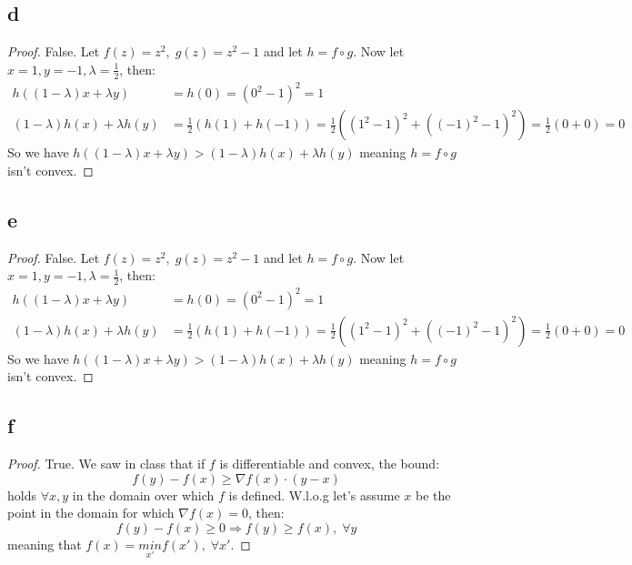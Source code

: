 \subsection*{d}
\begin{proof}    
    False. Let $f(z) = z^2, \; g(z) = z^2-1$ and let $h = f \circ g$. Now let $x=1, y=-1, \lambda=\frac{1}{2}$, then:
    \begin{equation*}
        \begin{split}
            h((1-\lambda)x + \lambda y) &= h(0) = (0^2-1)^2 = 1 \\
            (1-\lambda)h(x) + \lambda h(y) &= \frac{1}{2}(h(1) + h(-1)) = \frac{1}{2}((1^2-1)^2 + ((-1)^2-1)^2) = \frac{1}{2} (0 + 0) = 0
        \end{split}
    \end{equation*}
    So we have $h((1-\lambda)x + \lambda y) > (1-\lambda)h(x) + \lambda h(y)$ meaning $h = f \circ g$ isn't convex.
\end{proof}

\subsection*{e}
\begin{proof}
    False. Let $f(z) = z^2, \; g(z) = z^2-1$ and let $h = f \circ g$. Now let $x=1, y=-1, \lambda=\frac{1}{2}$, then:
    \begin{equation*}
        \begin{split}
            h((1-\lambda)x + \lambda y) &= h(0) = (0^2-1)^2 = 1 \\
            (1-\lambda)h(x) + \lambda h(y) &= \frac{1}{2}(h(1) + h(-1)) = \frac{1}{2}((1^2-1)^2 + ((-1)^2-1)^2) = \frac{1}{2} (0 + 0) = 0
        \end{split}
    \end{equation*}
    So we have $h((1-\lambda)x + \lambda y) > (1-\lambda)h(x) + \lambda h(y)$ meaning $h = f \circ g$ isn't convex.
\end{proof}

\subsection*{f}
\begin{proof}
    True. We saw in class that if $f$ is differentiable and convex, the bound:
    \begin{equation*}
        f(y) - f(x) \geq \nabla f(x) \cdot (y-x)
    \end{equation*}
    holds $\forall x,y$ in the domain over which $f$ is defined. W.l.o.g let's assume $x$ be the point in the domain for which $\nabla f(x) = 0$, then:
    \begin{equation*}
        f(y) - f(x) \geq 0 \Rightarrow f(y) \geq f(x), \; \forall y
    \end{equation*}
    meaning that $f(x) = \underset{x'}{min} f(x'), \; \forall x'$.
\end{proof}

